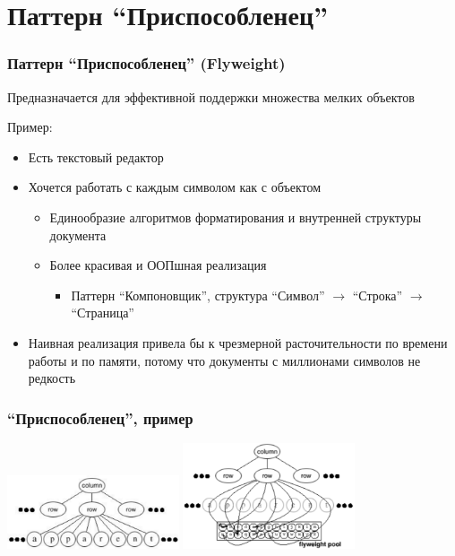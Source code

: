 \documentclass{../../slides-style}
\begin{document}
    \section{Паттерн ``Приспособленец''}

    \begin{frame}
        \frametitle{Паттерн ``Приспособленец'' (Flyweight)}
        Предназначается для эффективной поддержки множества мелких объектов

        Пример:

        \begin{itemize}
            \item Есть текстовый редактор
            \item Хочется работать с каждым символом как с объектом
            \begin{itemize}
                \item Единообразие алгоритмов форматирования и внутренней структуры документа
                \item Более красивая и ООПшная реализация
                \begin{itemize}
                    \item Паттерн ``Компоновщик'', структура ``Символ'' $\rightarrow$ ``Строка'' $\rightarrow$ ``Страница''
                \end{itemize}
            \end{itemize}
            \item Наивная реализация привела бы к чрезмерной расточительности по времени работы и по памяти, потому что документы с миллионами символов не редкость
        \end{itemize}
    \end{frame}

    \begin{frame}
        \frametitle{``Приспособленец'', пример}
        \begin{center}
            \includegraphics[width=0.38\textwidth]{noFlyweight.png}
            \raisebox{0.1\textheight}{\quad\Huge{$\rightarrow$}\quad}
            \includegraphics[width=0.38\textwidth]{flyweightExample.png}
        \end{center}
    \end{frame}
\end{document}

